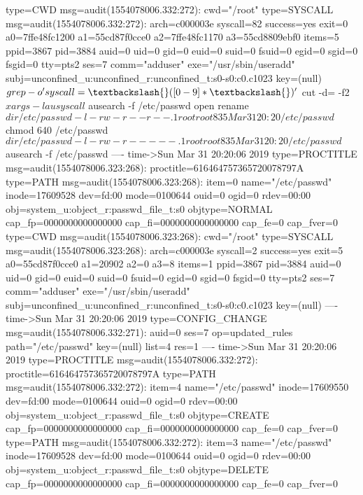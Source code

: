 \documentclass[]{report}
\newenvironment{Shaded}{}{}
\newcommand{\NormalTok}[1]{#1}
\begin{document}
\begin{Shaded}
\begin{Highlighting}[]
\NormalTok{type=CWD msg=audit(1554078006.332:272):  cwd="/root"}
\NormalTok{type=SYSCALL msg=audit(1554078006.332:272): arch=c000003e syscall=82 success=yes exit=0 a0=7ffe48fc1200 a1=55cd87f0cce0 a2=7ffe48fc1170 a3=55cd8809ebf0 items=5 ppid=3867 pid=3884 auid=0 uid=0 gid=0 euid=0 suid=0 fsuid=0 egid=0 sgid=0 fsgid=0 tty=pts2 ses=7 comm="adduser" exe="/usr/sbin/useradd" subj=unconfined_u:unconfined_r:unconfined_t:s0-s0:c0.c1023 key=(null)}
\NormalTok{$ grep -o 'syscall=\textbackslash{}([0-9]*\textbackslash{})'}
\NormalTok{$ cut -d= -f2}
\NormalTok{$ xargs -l ausyscall}
\NormalTok{$ ausearch -f /etc/passwd}
\NormalTok{open}
\NormalTok{rename}
\NormalTok{$ dir /etc/passwd -l}
\NormalTok{-rw-r--r--. 1 root root 835 Mar 31 20:20 /etc/passwd}
\NormalTok{$ chmod 640 /etc/passwd}
\NormalTok{$ dir /etc/passwd -l}
\NormalTok{-rw-r-----. 1 root root 835 Mar 31 20:20 /etc/passwd}
\NormalTok{$ ausearch -f /etc/passwd}
\NormalTok{----}
\NormalTok{time->Sun Mar 31 20:20:06 2019}
\NormalTok{type=PROCTITLE msg=audit(1554078006.323:268): proctitle=616464757365720078797A}
\NormalTok{type=PATH msg=audit(1554078006.323:268): item=0 name="/etc/passwd" inode=17609528 dev=fd:00 mode=0100644 ouid=0 ogid=0 rdev=00:00 obj=system_u:object_r:passwd_file_t:s0 objtype=NORMAL cap_fp=0000000000000000 cap_fi=0000000000000000 cap_fe=0 cap_fver=0}
\NormalTok{type=CWD msg=audit(1554078006.323:268):  cwd="/root"}
\NormalTok{type=SYSCALL msg=audit(1554078006.323:268): arch=c000003e syscall=2 success=yes exit=5 a0=55cd87f0cce0 a1=20902 a2=0 a3=8 items=1 ppid=3867 pid=3884 auid=0 uid=0 gid=0 euid=0 suid=0 fsuid=0 egid=0 sgid=0 fsgid=0 tty=pts2 ses=7 comm="adduser" exe="/usr/sbin/useradd" subj=unconfined_u:unconfined_r:unconfined_t:s0-s0:c0.c1023 key=(null)}
\NormalTok{----}
\NormalTok{time->Sun Mar 31 20:20:06 2019}
\NormalTok{type=CONFIG_CHANGE msg=audit(1554078006.332:271): auid=0 ses=7 op=updated_rules path="/etc/passwd" key=(null) list=4 res=1}
\NormalTok{----}
\NormalTok{time->Sun Mar 31 20:20:06 2019}
\NormalTok{type=PROCTITLE msg=audit(1554078006.332:272): proctitle=616464757365720078797A}
\NormalTok{type=PATH msg=audit(1554078006.332:272): item=4 name="/etc/passwd" inode=17609550 dev=fd:00 mode=0100644 ouid=0 ogid=0 rdev=00:00 obj=system_u:object_r:passwd_file_t:s0 objtype=CREATE cap_fp=0000000000000000 cap_fi=0000000000000000 cap_fe=0 cap_fver=0}
\NormalTok{type=PATH msg=audit(1554078006.332:272): item=3 name="/etc/passwd" inode=17609528 dev=fd:00 mode=0100644 ouid=0 ogid=0 rdev=00:00 obj=system_u:object_r:passwd_file_t:s0 objtype=DELETE cap_fp=0000000000000000 cap_fi=0000000000000000 cap_fe=0 cap_fver=0}

\end{Highlighting}
\end{Shaded}
\end{document}
